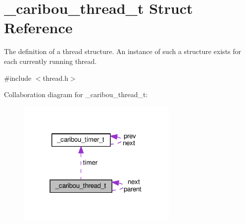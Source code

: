 \hypertarget{struct__caribou__thread__t}{\section{\-\_\-caribou\-\_\-thread\-\_\-t Struct Reference}
\label{struct__caribou__thread__t}
}


The definition of a thread structure. An instance of such a structure exists for each currently running thread.  




{\ttfamily \#include $<$thread.\-h$>$}



Collaboration diagram for \-\_\-caribou\-\_\-thread\-\_\-t\-:\nopagebreak
\begin{figure}[H]
\begin{center}
\leavevmode
\includegraphics[width=220pt]{struct__caribou__thread__t__coll__graph}
\end{center}
\end{figure}
